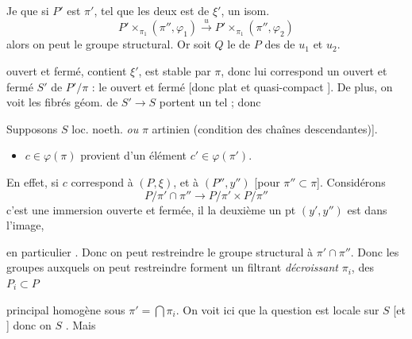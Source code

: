 \documentclass[11pt,a4paper]{article}
\begin{document}
Je   \ill{} que si $P'$ est \ill{} $\pi'$,
\ill{} tel que \ill{} les deux \ill{} est  de $\xi'$,
\ill{} un isom.
\[
  P' \times_{\pi_1}(\pi'', \varphi_1) \xrightarrow{\ u\ }
  P' \times_{\pi_1}(\pi'', \varphi_2)
\]
alors on peut \ill{} le groupe structural. Or soit $Q$ le
 de $P$ des  de $u_1$ et $u_2$.


\ill{} ouvert et fermé, contient $\xi'$, est stable par $\pi$, donc lui
correspond un  ouvert et fermé $S'$ de $P'/\pi$ :
le \ill{} ouvert et fermé  [donc
 plat et quasi-compact \ill{}]. De plus, on voit
 les \struck{\ill{}} fibrés géom. de $S' \to S$ \ill{}
portent un tel ; donc \ill{}


Supposons  $S$ loc. noeth. \emph{ou} $\pi$ artinien (condition des
chaînes descendantes)].

\begin{itemize}
\item[d)] \ill{} $c \in \varphi(\pi)$ \ill{} provient \ill{} d'un élément
 $c' \in \varphi(\pi')$.
\end{itemize}

En effet, si $c$ correspond à $(P,\xi)$,  \ill{} et à
$(P'', y'')$ [pour $\pi'' \subset \pi$]. Considérons
\[
  P/\pi' \cap \pi'' \longrightarrow P/\pi' \times P/\pi''
\]
c'est une immersion ouverte et fermée, il \ill{} la deuxième \ill{}
\ill{} un pt $(y',y'')$ est dans l'image, \ill{}

\ill{} en particulier \ill{}. Donc on peut restreindre le groupe structural
à $\pi' \cap \pi''$. Donc les groupes auxquels on peut restreindre forment un
\ill{} filtrant \emph{décroissant} $\pi_i$, \ill{} des $P_i \subset P$
\ill{}

\struck{\ill{}}



principal homogène sous $\pi' = \bigcap \pi_i$. On voit ici que la question est
locale sur $S$ [et \ill{} ] donc on 
$S$ \ill{}. Mais \ill{}
\end{document}
